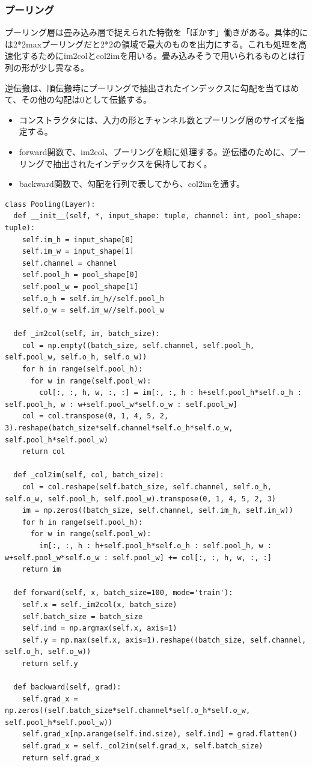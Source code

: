 \documentclass[platex,dvipdfmx]{jsarticle}
\begin{document}
\newpage

\subsubsection{プーリング}

プーリング層は畳み込み層で捉えられた特徴を「ぼかす」働きがある。具体的には2*2maxプーリングだと2*2の領域で最大のものを出力にする。これも処理を高速化するためにim2colとcol2imを用いる。畳み込みそうで用いられるものとは行列の形が少し異なる。

逆伝搬は、順伝搬時にプーリングで抽出されたインデックスに勾配を当てはめて、その他の勾配は0として伝搬する。

\begin{itemize}
  \item コンストラクタには、入力の形とチャンネル数とプーリング層のサイズを指定する。
  \item forward関数で、im2col、プーリングを順に処理する。逆伝播のために、プーリングで抽出されたインデックスを保持しておく。
  \item backward関数で、勾配を行列で表してから、col2imを通す。
\end{itemize}

\begin{lstlisting}[caption=ex\_advanced.py, label=Pooling]
class Pooling(Layer):
  def __init__(self, *, input_shape: tuple, channel: int, pool_shape: tuple):
    self.im_h = input_shape[0]
    self.im_w = input_shape[1]
    self.channel = channel
    self.pool_h = pool_shape[0]
    self.pool_w = pool_shape[1]
    self.o_h = self.im_h//self.pool_h
    self.o_w = self.im_w//self.pool_w

  def _im2col(self, im, batch_size):
    col = np.empty((batch_size, self.channel, self.pool_h, self.pool_w, self.o_h, self.o_w))
    for h in range(self.pool_h):
      for w in range(self.pool_w):
        col[:, :, h, w, :, :] = im[:, :, h : h+self.pool_h*self.o_h : self.pool_h, w : w+self.pool_w*self.o_w : self.pool_w]
    col = col.transpose(0, 1, 4, 5, 2, 3).reshape(batch_size*self.channel*self.o_h*self.o_w, self.pool_h*self.pool_w)
    return col

  def _col2im(self, col, batch_size):
    col = col.reshape(self.batch_size, self.channel, self.o_h, self.o_w, self.pool_h, self.pool_w).transpose(0, 1, 4, 5, 2, 3)
    im = np.zeros((batch_size, self.channel, self.im_h, self.im_w))
    for h in range(self.pool_h):
      for w in range(self.pool_w):
        im[:, :, h : h+self.pool_h*self.o_h : self.pool_h, w : w+self.pool_w*self.o_w : self.pool_w] += col[:, :, h, w, :, :]
    return im

  def forward(self, x, batch_size=100, mode='train'):
    self.x = self._im2col(x, batch_size)
    self.batch_size = batch_size
    self.ind = np.argmax(self.x, axis=1)
    self.y = np.max(self.x, axis=1).reshape((batch_size, self.channel, self.o_h, self.o_w))
    return self.y

  def backward(self, grad):
    self.grad_x = np.zeros((self.batch_size*self.channel*self.o_h*self.o_w, self.pool_h*self.pool_w))
    self.grad_x[np.arange(self.ind.size), self.ind] = grad.flatten()
    self.grad_x = self._col2im(self.grad_x, self.batch_size)
    return self.grad_x
\end{lstlisting}
\end{document}
